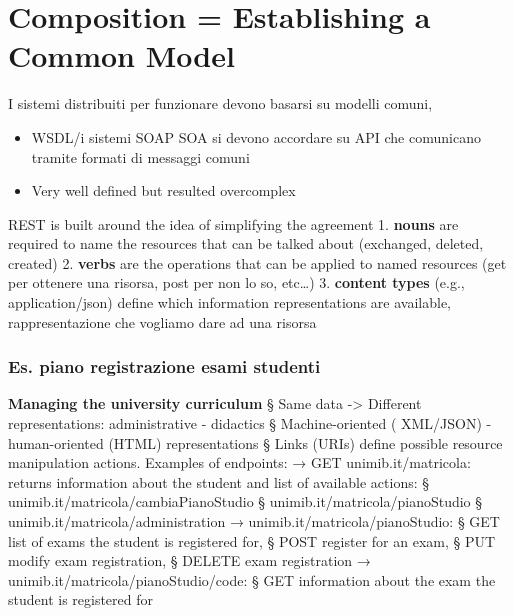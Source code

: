 \section{Composition = Establishing a Common Model}
I sistemi distribuiti per funzionare devono basarsi su modelli comuni,
\begin{itemize}
    \item WSDL/i sistemi SOAP SOA si devono accordare su API che comunicano tramite formati di messaggi comuni 
    \item Very well defined but resulted overcomplex
\end{itemize}
REST is built around the idea of simplifying the agreement
1. \textbf{nouns} are required to name the resources that can be talked about (exchanged, deleted, created)
2. \textbf{verbs} are the operations that can be applied to named resources (get per ottenere una risorsa, post per non lo so, etc\dots)
3. \textbf{content types} (e.g., application/json) define which information representations are available, rappresentazione che vogliamo dare ad una risorsa

\subsubsection{Es. piano registrazione esami studenti}
\textbf{Managing the university curriculum}
§ Same data -> Different representations: administrative - didactics
§ Machine-oriented ( XML/JSON) - human-oriented (HTML) representations
§ Links (URIs) define possible resource manipulation actions. Examples of endpoints:
→ GET unimib.it/{matricola}: returns information about the student and list of available actions:
§ unimib.it/{matricola}/cambiaPianoStudio
§ unimib.it/{matricola}/pianoStudio
§ unimib.it/{matricola}/administration
→ unimib.it/{matricola}/pianoStudio:
§ GET list of exams the student is registered for,
§ POST register for an exam,
§ PUT modify exam registration,
§ DELETE exam registration
→ unimib.it/{matricola}/pianoStudio/{code}:
§ GET information about the exam the student is registered for

